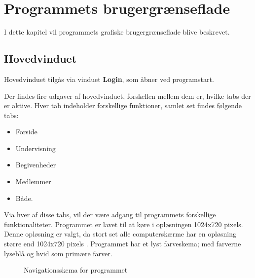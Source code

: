 \chapter{Programmets brugergrænseflade}

I dette kapitel vil programmets grafiske brugergrænseflade blive beskrevet.

\section{Hovedvinduet} 
Hovedvinduet tilgås via vinduet \textbf{Login}, som åbner ved programstart. 

Der findes fire udgaver af hovedvinduet, forskellen mellem dem er, hvilke tabs der er aktive.
Hver tab indeholder forskellige funktioner, samlet set findes følgende tabs:
\begin{itemize}%
    \item Forside
    \item Undervisning
    \item Begivenheder
    \item Medlemmer
    \item Både.
\end{itemize}

Via hver af disse tabs, vil der være adgang til programmets forskellige funktionaliteter.
Programmet er lavet til at køre i opløsningen 1024x720 pixels.
Denne opløsning er valgt, da stort set alle computerskærme har en opløsning større end 1024x720 pixels \citep{resolutions}. 
Programmet har et lyst farveskema; med farverne lyseblå og hvid som primære farver.


\begin{center}
    \begin{figure}[H]
        \caption{Navigationsskema for programmet}
        \label{img:programNavigation}
        \vspace{-60pt}
    \end{figure}
\end{center}


